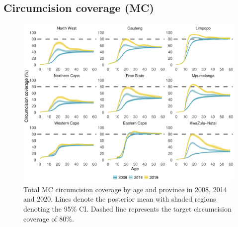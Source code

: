 \documentclass{article}
\begin{document}
\begin{appendix}

\subsection{Circumcision coverage (MC)}


\begin{figure}[H]
	\centering
	\includegraphics[width = \linewidth]{Figures/suppmat/Coverage/MCcoverage_SingleAge_Province.pdf}
	\caption{Total MC circumcision coverage by age and province in 2008, 2014 and 2020. Lines denote the posterior mean with shaded regions denoting the 95\% CI. Dashed line represents the target circumcision coverage of 80\%.}
\end{figure}	



\end{appendix}
\end{document}
